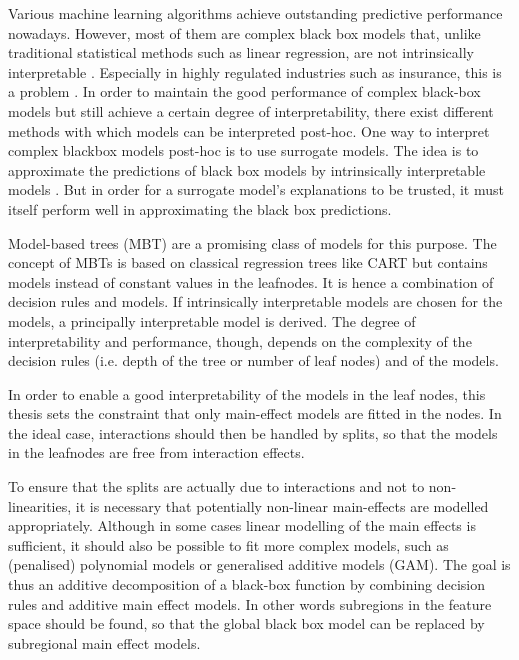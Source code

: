 Various machine learning algorithms achieve outstanding predictive performance nowadays. However, most of them are complex black box models that, unlike traditional statistical methods such as linear regression, are not intrinsically interpretable \citep{Hu.2020}.
Especially in highly regulated industries such as insurance, this is a problem \citep{Henckaerts.2022}.
In order to maintain the good performance of complex black-box models but still achieve a certain degree of interpretability, there exist different methods with which models can be interpreted post-hoc. 
One way to interpret complex blackbox models post-hoc is to use surrogate models. The idea is to approximate the predictions of black box models by intrinsically interpretable models \citep{Molnar.2019}.
But in order for a surrogate model's explanations to be trusted, it must itself perform well in approximating the black box predictions. 


Model-based trees (MBT) are a promising class of models for this purpose. 
The concept of MBTs is based on classical regression trees like CART \citep{Breiman.1984} but contains models instead of constant values in the leafnodes.
It is hence a combination of decision rules and models. If intrinsically interpretable models are chosen for the models, a principally interpretable model is derived. The degree of interpretability and performance, though, depends on the complexity of the decision rules (i.e. depth of the tree or number of leaf nodes) and of the models.


In order to enable a good interpretability of the models in the leaf nodes, this thesis sets the constraint that only main-effect models are fitted in the nodes. 
In the ideal case, interactions should then be handled by  splits, so that the models in the leafnodes are free from interaction effects.

To ensure that the splits are actually due to interactions and not to non-linearities, it is necessary that potentially non-linear main-effects are modelled appropriately.
Although in some cases linear modelling of the main effects is sufficient, it should also be possible to fit more complex models, such as (penalised) polynomial models or generalised additive models (GAM).
The goal is thus an additive decomposition of a black-box function by combining decision rules and additive main effect models.  In other words
subregions in the feature space should be found, so that the global black box model can be replaced by subregional main effect models.


